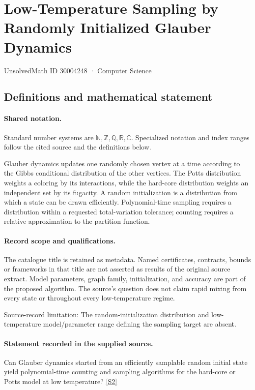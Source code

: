 \documentclass[11pt]{article}
\newcommand{\sref}[2]{\hyperlink{source:#1:#2}{[S#2]}}
\begin{document}
\setcounter{section}{30004247}
\section{Low-Temperature Sampling by Randomly Initialized Glauber Dynamics}\label{30004248}
{\small\sffamily UnsolvedMath ID 30004248 · Computer Science}
\subsection{Definitions and mathematical statement}

\paragraph{Shared notation.}Standard number systems are $\mathbb N,\mathbb Z,\mathbb Q,\mathbb R,\mathbb C$. Specialized notation and index ranges follow the cited source and the definitions below.


Glauber dynamics updates one randomly chosen vertex at a time according to the Gibbs conditional distribution of the other vertices. The Potts distribution weights a coloring by its interactions, while the hard-core distribution weights an independent set by its fugacity. A random initialization is a distribution from which a state can be drawn efficiently. Polynomial-time sampling requires a distribution within a requested total-variation tolerance; counting requires a relative approximation to the partition function.
\paragraph{Record scope and qualifications.}
The catalogue title is retained as metadata. Named certificates, contracts, bounds or frameworks in that title are not asserted as results of the original source extract.
Model parameters, graph family, initialization, and accuracy are part of the proposed algorithm. The source's question does not claim rapid mixing from every state or throughout every low-temperature regime.

Source-record limitation: The random-initialization distribution and low-temperature model/parameter range defining the sampling target are absent.
\paragraph{Statement recorded in the supplied source.}
Can Glauber dynamics started from an efficiently samplable random initial state yield polynomial-time counting and sampling algorithms for the hard-core or Potts model at low temperature? \sref{30004248}{2}
\end{document}

